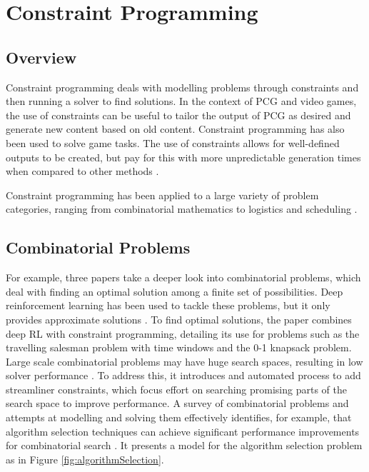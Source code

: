 \section{Constraint Programming}
\subsection{Overview}
Constraint programming deals with modelling problems through constraints and then running a solver to find solutions. In the context of PCG and video games, the use of constraints can be useful to tailor the output of PCG as desired and generate new content based on old content. Constraint programming has also been used to solve game tasks. The use of constraints allows for well-defined outputs to be created, but pay for this with more unpredictable generation times when compared to other methods \cite{WFC_In_The_Wild}.

Constraint programming has been applied to a large variety of problem categories, ranging from combinatorial mathematics to logistics and scheduling \cite{CSPLib}.

\subsection{Combinatorial Problems}
For example, three papers take a deeper look into combinatorial problems, which deal with finding an optimal solution among a finite set of possibilities. Deep reinforcement learning has been used to tackle these problems, but it only provides approximate solutions \cite{Combinatorics_CP_RL}. To find optimal solutions, the paper combines deep RL with constraint programming, detailing its use for problems such as the travelling salesman problem with time windows and the 0-1 knapsack problem. Large scale combinatorial problems may have huge search spaces, resulting in low solver performance \cite{Combinatorics_CP_RL}. To address this, it introduces and automated process to add streamliner constraints, which focus effort on searching promising parts of the search space to improve performance. A survey of combinatorial problems and attempts at modelling and solving them effectively identifies, for example, that algorithm selection techniques can achieve significant performance improvements for combinatorial search \cite{Data_Mining_and_Constraint_Programming}. It presents a model for the algorithm selection problem as in Figure \ref{fig:algorithmSelection}.

